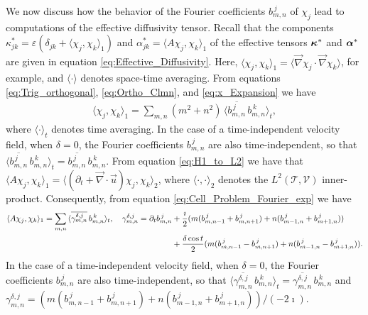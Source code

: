 \documentclass{article}
\newcommand\bkappa{\mbox{\boldmath${\kappa}$}}
\newcommand\balpha{\mbox{\boldmath${\alpha}$}}
\newcommand{\Tc}{\mathcal{T}}
\newcommand{\Vc}{\mathcal{V}}
\newcommand{\0}{\mathbf{0}}
\newcommand{\1}{\mathbf{1}}
\newcommand{\2}{\mathbf{2}}
\newcommand{\3}{\mathbf{3}}
\newcommand{\4}{\mathbf{4}}
\newcommand{\5}{\mathbf{5}}
\newcommand{\6}{\mathbf{6}}
\newcommand{\7}{\mathbf{7}}
\newcommand{\8}{\mathbf{8}}
\begin{document}
We now discuss how the behavior of the Fourier coefficients
$b^{\,j}_{m,n}$ of $\chi_j$ lead to computations
of the effective diffusivity tensor. Recall that the components
$\kappa^*_{jk}=\varepsilon(\delta_{jk}+\langle\chi_j,\chi_k\rangle_1)$ and $\alpha^*_{jk}=\langle A\chi_j,\chi_k\rangle_1$ of the
effective tensors $\bkappa^*$ and $\balpha^*$ are given in equation
\eqref{eq:Effective_Diffusivity}. Here,
$\langle\chi_j,\chi_k\rangle_1=\langle\vec{\nabla}\chi_j\cdot\vec{\nabla}\chi_k\rangle$, for example, and $\langle\cdot\rangle$ denotes
space-time averaging.
From equations
\eqref{eq:Trig_orthogonal}, \eqref{eq:Ortho_Clmn}, and
\eqref{eq:x_Expansion} we have    
%
\begin{align}
  \langle\chi_j,\chi_k\rangle_1=\sum_{m,n}(m^2+n^2)\,\langle\overline{b^{\,j}_{m,n}}\,b^{\,k}_{m,n}\rangle_t,
\end{align}
%
where $\langle\cdot\rangle_t$ denotes time averaging.
In the case of a
time-independent velocity field, when $\delta=0$, the Fourier
coefficients $b^{\,j}_{m,n}$ are also time-independent, so that
$\langle\overline{b^{\,j}_{m,n}}\,b^{\,k}_{m,n}\rangle_t=\overline{b^{\,j}_{m,n}}\,b^{\,k}_{m,n}$. From
equation \eqref{eq:H1_to_L2} we have that
$\langle A\chi_j,\chi_k\rangle_1=\langle(\partial_t+\vec{\nabla}\cdot\vec{u})\chi_j,\chi_k\rangle_2$, where $\langle\cdot,\cdot\rangle_2$
denotes the $L^2(\Tc,\Vc)$ inner-product. Consequently,
from equation
\eqref{eq:Cell_Problem_Fourier_exp} we have  
%
\begin{align}
  \langle A\chi_j,\chi_k\rangle_1=\sum_{m,n}\,\langle\overline{\gamma_{m,n}^{\delta,j}}\,b^{\,k}_{m,n}\rangle_t,\quad
  \gamma_{m,n}^{\delta,j}=\partial_tb^{\,j}_{m,n}
    &+\frac{\imath}{2}(m(b^{\,j}_{m,n-1}+b^{\,j}_{m,n+1})+n(b^{\,j}_{m-1,n}+b^{\,j}_{m+1,n}))
    \\
    &+\frac{\delta\cos{t}}{2}(m(b^{\,j}_{m,n-1}-b^{\,j}_{m,n+1})+n(b^{\,j}_{m-1,n}-b^{\,j}_{m+1,n})).
  \notag
\end{align}
%
In the case of a time-independent velocity field, when $\delta=0$, the
Fourier coefficients $b^{\,j}_{m,n}$ are also time-independent, so that
$\langle\overline{\gamma^{\delta,j}_{m,n}}\,b^{\,k}_{m,n}\rangle_t=\overline{\gamma^{\delta,j}_{m,n}}\,b^{\,k}_{m,n}$
and
$\gamma_{m,n}^{\delta,j}=(m(b^{\,j}_{m,n-1}+b^{\,j}_{m,n+1})+n(b^{\,j}_{m-1,n}+b^{\,j}_{m+1,n}))/(-2\imath)$.
\end{document}
